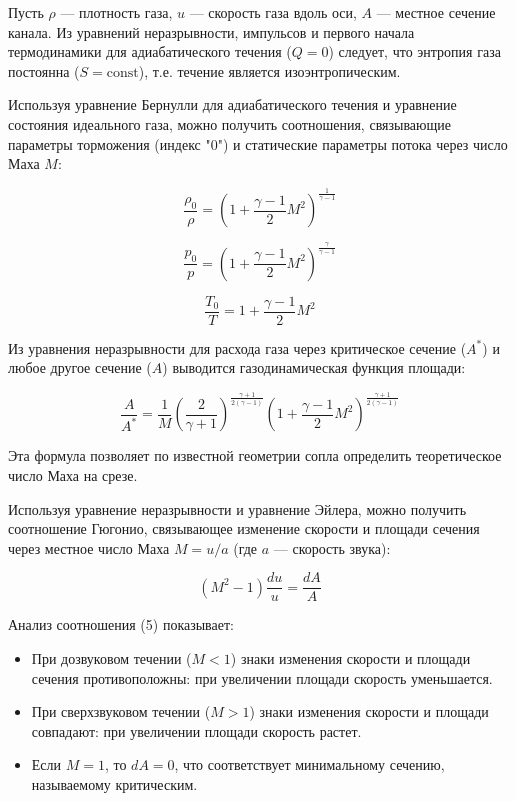 \documentclass[12pt,a4paper]{article}
\begin{document}
Пусть \(\rho\) — плотность газа, \(u\) — скорость газа вдоль оси, \(A\) — местное сечение канала. Из уравнений неразрывности, импульсов и первого начала термодинамики для адиабатического течения (\(Q=0\)) следует, что энтропия газа постоянна (\(S = \text{const}\)), т.е. течение является изоэнтропическим.

Используя уравнение Бернулли для адиабатического течения и уравнение состояния идеального газа, можно получить соотношения, связывающие параметры торможения (индекс "0") и статические параметры потока через число Маха \(M\):

\begin{equation}
\frac{\rho_0}{\rho} = \left( 1 + \frac{\gamma-1}{2} M^2 \right)^{\frac{1}{\gamma-1}}
\end{equation}

\begin{equation}
\frac{p_0}{p} = \left( 1 + \frac{\gamma-1}{2} M^2 \right)^{\frac{\gamma}{\gamma-1}}
\end{equation}

\begin{equation}
\frac{T_0}{T} = 1 + \frac{\gamma-1}{2} M^2
\end{equation}

Из уравнения неразрывности для расхода газа через критическое сечение (\(A^*\)) и любое другое сечение (\(A\)) выводится газодинамическая функция площади:

\begin{equation}
\frac{A}{A^*} = \frac{1}{M} \left( \frac{2}{\gamma+1} \right)^{\frac{\gamma+1}{2(\gamma-1)}} \left( 1 + \frac{\gamma-1}{2} M^2 \right)^{\frac{\gamma+1}{2(\gamma-1)}}
\end{equation}

Эта формула позволяет по известной геометрии сопла определить теоретическое число Маха на срезе.

Используя уравнение неразрывности и уравнение Эйлера, можно получить соотношение Гюгонио, связывающее изменение скорости и площади сечения через местное число Маха \(M = u/a\) (где \(a\) — скорость звука):

\begin{equation}
(M^2 - 1) \frac{du}{u} = \frac{dA}{A}
\end{equation}

Анализ соотношения (5) показывает:
\begin{itemize}
	\item При дозвуковом течении (\(M < 1\)) знаки изменения скорости и площади сечения противоположны: при увеличении площади скорость уменьшается.
	\item При сверхзвуковом течении (\(M > 1\)) знаки изменения скорости и площади совпадают: при увеличении площади скорость растет.
	\item Если \(M = 1\), то \(dA = 0\), что соответствует минимальному сечению, называемому критическим.
\end{itemize}
\end{document}

